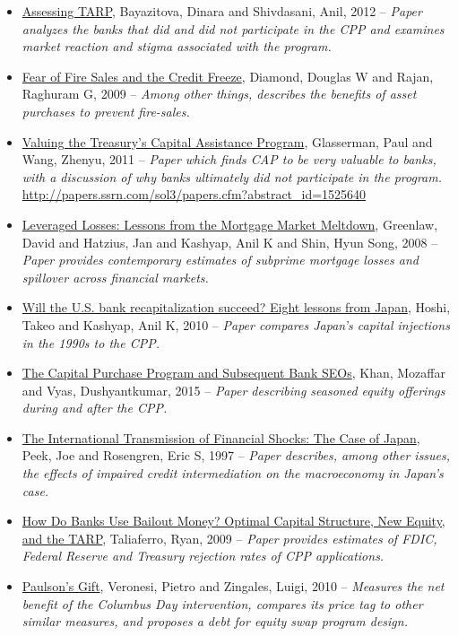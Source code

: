 \documentclass[12pt]{article}
\begin{document}
\begin{itemize}
\item
\ul{Assessing TARP},
Bayazitova, Dinara and Shivdasani, Anil, 2012 -- \emph{Paper analyzes the banks that did and did not participate in the CPP and examines market reaction and stigma associated with the program.}
\item
\ul{Fear of Fire Sales and the Credit Freeze},
Diamond, Douglas W and Rajan, Raghuram G, 2009 -- \emph{Among other things, describes the benefits of asset purchases to prevent fire-sales.}
\item
\ul{Valuing the Treasury's Capital Assistance Program},
Glasserman, Paul and Wang, Zhenyu, 2011 -- \emph{Paper
which finds CAP to be very valuable to banks, with a discussion of why banks ultimately did not participate in the program.} \url{http://papers.ssrn.com/sol3/papers.cfm?abstract_id=1525640}
\item
\ul{Leveraged Losses: Lessons from the Mortgage Market Meltdown},
Greenlaw, David and Hatzius, Jan and Kashyap, Anil K and Shin, Hyun Song, 2008 -- \emph{Paper provides contemporary estimates of subprime mortgage losses and spillover across financial markets.}
\item
\ul{Will the U.S. bank recapitalization succeed? Eight lessons from Japan},
Hoshi, Takeo and Kashyap, Anil K, 2010 -- \emph{Paper compares Japan's capital injections in the 1990s to the CPP.}
\item
\ul{The Capital Purchase Program and Subsequent Bank SEOs},
Khan, Mozaffar and Vyas, Dushyantkumar, 2015 -- \emph{Paper describing seasoned equity offerings during and after the CPP.}
\item
\ul{The International Transmission of Financial Shocks: The Case of Japan},
Peek, Joe and Rosengren, Eric S, 1997 -- \emph{Paper describes, among other issues, the effects of impaired credit intermediation on the macroeconomy in Japan's case.}
\item
\ul{How Do Banks Use Bailout Money? Optimal Capital Structure, New Equity, and the TARP},
Taliaferro, Ryan, 2009 -- \emph{Paper provides estimates of FDIC, Federal Reserve and Treasury rejection rates of CPP applications.}
\item
\ul{Paulson's Gift},
Veronesi, Pietro and Zingales, Luigi, 2010 -- \emph{Measures the net benefit of the Columbus Day intervention, compares its price tag to other similar measures, and proposes a debt for equity swap program design.}
\end{itemize}
\end{document}

